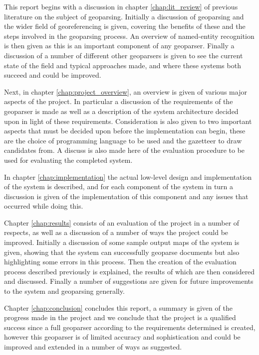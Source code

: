 \documentclass[12pt, a4paper]{report}
\begin{document}
This report begins with a discussion in chapter \ref{chap:lit_review} of previous literature on the subject of geoparsing. Initially a discussion of geoparsing and the wider field of georeferencing is given, covering the benefits of these and the steps involved in the geoparsing process. An overview of named-entity recognition is then given as this is an important component of any geoparser. Finally a discussion of a number of different other geoparsers is given to see the current state of the field and typical approaches made, and where these systems both succeed and could be improved.

Next, in chapter \ref{chap:project_overview}, an overview is given of various major aspects of the project. In particular a discussion of the requirements of the geoparser is made as well as a description of the system architecture decided upon in light of these requirements. Consideration is also given to two important aspects that must be decided upon before the implementation can begin, these are the choice of programming language to be used and the gazetteer to draw candidates from. A discuss is also made here of the evaluation procedure to be used for evaluating the completed system.

In chapter \ref{chap:implementation} the actual low-level design and implementation of the system is described, and for each component of the system in turn a discussion is given of the implementation of this component and any issues that occurred while doing this.

Chapter \ref{chap:results} consists of an evaluation of the project in a number of respects, as well as a discussion of a number of ways the project could be improved. Initially a discussion of some sample output maps of the system is given, showing that the system can successfully geoparse documents but also highlighting some errors in this process. Then the creation of the evaluation process described previously is explained, the results of which are then considered and discussed. Finally a number of suggestions are given for future improvements to the system and geoparsing generally.

Chapter \ref{chap:conclusion} concludes this report, a summary is given of the progress made in the project and we conclude that the project is a qualified success since a full geoparser according to the requirements determined is created, however this geoparser is of limited accuracy and sophistication and could be improved and extended in a number of ways as suggested.
\end{document}
